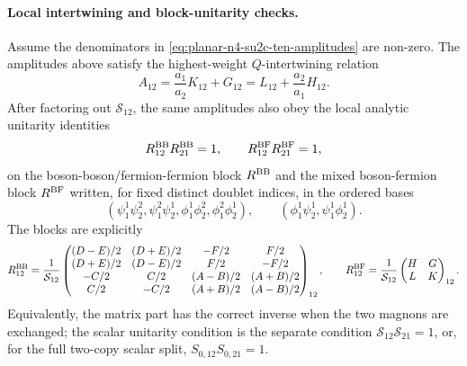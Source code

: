 \paragraph{Local intertwining and block-unitarity checks.}
\label{par:planar-n4-su2c-local-amplitude-checks}
Assume the denominators in
\eqref{eq:planar-n4-su2c-ten-amplitudes} are non-zero.  The amplitudes above
satisfy the highest-weight \(Q\)-intertwining relation
\begin{equation}
  A_{12}
  =
  \frac{a_1}{a_2}K_{12}+G_{12}
  =
  L_{12}+\frac{a_2}{a_1}H_{12}.
  \label{eq:planar-n4-su2c-q-check}
\end{equation}
After factoring out \(\mathcal S_{12}\), the same amplitudes also obey the
local analytic unitarity identities
\[
  R_{12}^{\rm BB}R_{21}^{\rm BB}=1,
  \qquad
  R_{12}^{\rm BF}R_{21}^{\rm BF}=1,
\]
on the boson-boson/fermion-fermion block \(R^{\rm BB}\) and the mixed
boson-fermion block \(R^{\rm BF}\) written, for fixed distinct doublet
indices, in the ordered bases
\[
  (\psi_1^1\psi_2^2,\psi_1^2\psi_2^1,\phi_1^1\phi_2^2,\phi_1^2\phi_2^1),
  \qquad
  (\phi_1^1\psi_2^1,\psi_1^1\phi_2^1).
\]
The blocks are explicitly
\[
  R_{12}^{\rm BB}
  =
  \frac1{\mathcal S_{12}}
  \begin{pmatrix}
    (D-E)/2 & (D+E)/2 & -F/2 & F/2\\
    (D+E)/2 & (D-E)/2 & F/2 & -F/2\\
    -C/2 & C/2 & (A-B)/2 & (A+B)/2\\
    C/2 & -C/2 & (A+B)/2 & (A-B)/2
  \end{pmatrix}_{12},
  \qquad
  R_{12}^{\rm BF}
  =
  \frac1{\mathcal S_{12}}
  \begin{pmatrix}
    H & G\\
    L & K
  \end{pmatrix}_{12}.
\]
Equivalently, the matrix part has the correct inverse when the two magnons are
exchanged; the scalar unitarity condition is the separate condition
\(\mathcal S_{12}\mathcal S_{21}=1\), or, for the full two-copy scalar split,
\(S_{0,12}S_{0,21}=1\).

